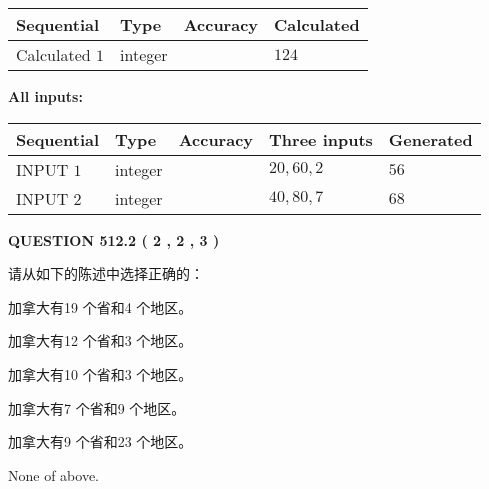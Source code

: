 \documentclass{ctexart}
\begin{document}
   
   
   
\noindent{}
   
   
  
  
\noindent\begin{tabular}{|l|l|l|l|}
\hline
 Sequential & Type & Accuracy & Calculated \\ 
\hline
 
 
  Calculated $  1 $ & integer &  & 
  $ 124 $ 
 \\  \hline  
 \end{tabular}
   
   
   
   
\noindent\vspace{0.1in}\hspace{-0.08in} {\textbf{\Large{All inputs: }}}
   
   
  
  
\noindent\begin{tabular}{|l|l|l|l|l|}
\hline
 Sequential & Type & Accuracy & Three inputs & Generated \\ 
\hline
 
 
  INPUT $  1 $ & integer &  & $
 20
 , 
 60
 , 
 2
 $ & $ 56 $ 
 \\  \hline  
 
 
  INPUT $  2 $ & integer &  & $
 40
 , 
 80
 , 
 7
 $ & $ 68 $ 
 \\  \hline  
 \end{tabular}
   
   
  
\vspace{0.2in}
  
{\textbf{\Large{QUESTION
512.2 
 ( 2 , 2 , 3 )
}}}
  
  
请从如下的陈述中选择正确的：
 
 
加拿大有19 个省和4 个地区。
 
 
加拿大有12 个省和3 个地区。
 
 
加拿大有10 个省和3 个地区。
 
 
加拿大有7 个省和9 个地区。
 
 
加拿大有9 个省和23 个地区。
 
 
 None of above.
 
 
\noindent{}
 
\end{document}
